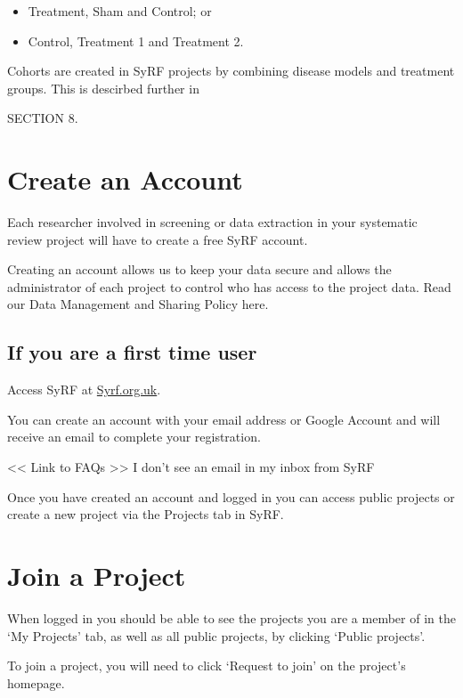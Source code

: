 \documentclass[
]{book}
\providecommand{\tightlist}{%
  \setlength{\itemsep}{0pt}\setlength{\parskip}{0pt}}
\begin{document}
\begin{itemize}
\tightlist
\item
  Treatment, Sham and Control; or
\item
  Control, Treatment 1 and Treatment 2.
\end{itemize}

Cohorts are created in SyRF projects by combining disease models and treatment groups. This is descirbed further in

SECTION 8.

\hypertarget{createAccount}{%
\chapter{Create an Account}\label{createAccount}}

Each researcher involved in screening or data extraction in your systematic review project will have to create a free SyRF account.

Creating an account allows us to keep your data secure and allows the administrator of each project to control who has access to the project data. Read our Data Management and Sharing Policy here.

\hypertarget{if-you-are-a-first-time-user}{%
\section{If you are a first time user}\label{if-you-are-a-first-time-user}}

Access SyRF at \href{http://syrf.org.uk}{Syrf.org.uk}.

You can create an account with your email address or Google Account and will receive an email to complete your registration.

\textless{}\textless{} Link to FAQs \textgreater{}\textgreater{}
I don't see an email in my inbox from SyRF

Once you have created an account and logged in you can access public projects or create a new project via the Projects tab in SyRF.

\hypertarget{join}{%
\chapter{Join a Project}\label{join}}

When logged in you should be able to see the projects you are a member of in the `My Projects' tab, as well as all public projects, by clicking `Public projects'.

To join a project, you will need to click `Request to join' on the project's homepage.
\end{document}
